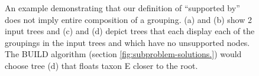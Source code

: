 \documentclass[fleqn,12pt,lineno,english]{wlpeerj}
\begin{document}
\begin{figure}
\hfill{}

\hfill{}

\caption{An example demonstrating that our definition of ``supported by''
does not imply entire composition of a grouping. (a) and (b) show
2 input trees and (c) and (d) depict trees that each display each
of the groupings in the input trees and which have no unsupported
nodes. The BUILD algorithm (section \ref{fig:subproblem-solutions.})
would choose tree (d) that floats taxon E closer to the root.}

\label{fig:toyambig}
\end{figure}
\end{document}
